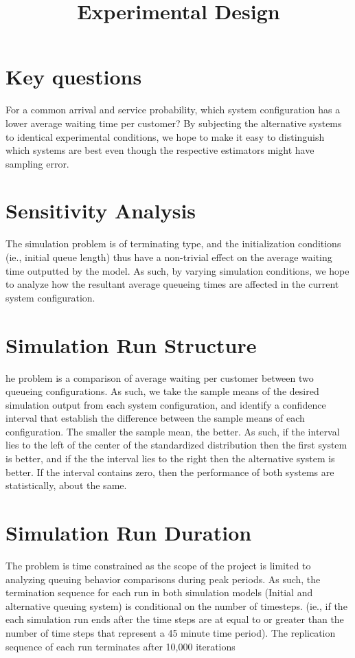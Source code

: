 \documentclass{article}
\begin{document}
\pagecolor{ultramarine}
\title{Experimental Design}
\author{}
\date{}
\maketitle
\section{Key questions}
For a common arrival and service probability, which system configuration has a lower average waiting time per customer? By subjecting the alternative systems to identical experimental conditions, we hope to make it easy to distinguish which systems are best even though the respective estimators might have sampling error.

\section{Sensitivity Analysis}
The simulation problem is of terminating type, and the initialization conditions (ie., initial queue length) thus have a non-trivial effect on the average waiting time outputted by the model. As such, by varying simulation conditions, we hope to analyze how the resultant average queueing times are affected in the current system configuration.

\section{Simulation Run Structure}
he problem is a comparison of average waiting per customer between two queueing configurations. As such, we take the sample means of the desired simulation output from each system configuration, and identify a confidence interval that establish the difference between the sample means of each configuration. The smaller the sample mean, the better. As such, if the interval lies to the left of the center of the standardized distribution then the first system is better, and if the the interval lies to the right then the alternative system is better. If the interval contains zero, then the performance of both systems are statistically, about the same.

\section{Simulation Run Duration}
The problem is time constrained as the scope of the project is limited to analyzing queuing behavior comparisons during peak periods. As such, the termination sequence for each run in both simulation models (Initial and alternative queuing system) is conditional on the number of timesteps. (ie., if the each simulation run ends after the time steps are at equal to or greater than the number of time steps that represent a 45 minute time period). The replication sequence of each run terminates after 10,000 iterations
\end{document}
